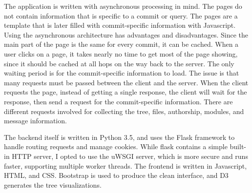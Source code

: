 The application is written with asynchronous processing in mind.
The pages do not contain information that is specific to a commit or
query.
The pages are a template that is later filled with commit-specific
information with Javascript.
Using the asynchronous architecture has advantages and disadvantages.
Since the main part of the page is the same for every commit,
it can be cached.
When a user clicks on a page, it takes nearly no time to get most of
the page showing, since it should be cached at all hops on the way back
to the server.
The only waiting period is for the commit-specific information to load.
The issue is that many requests must be passed between the client and
the server.
When the client requests the page, instead of getting a single
response, the client will wait for the response, then send a request
for the commit-specific information.
There are different requests involved for collecting the tree, files,
authorship, modules, and message information.


The backend itself is written in Python 3.5, and uses the Flask
framework to handle routing requests and manage cookies. While flask
contains a simple built-in HTTP server, I opted to use the uWSGI server,
which is more secure and runs faster, supporting multiple worker
threads. The frontend is written in Javascript, HTML, and CSS. Bootstrap
is used to produce the clean interface, and D3 generates the tree
visualizations.

